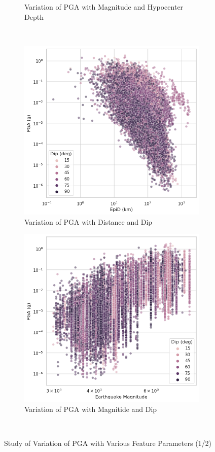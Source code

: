 \documentclass[a4paper,10pt]{article}
\begin{document}
\begin{figure}[h]
\begin{subfigure}[b]{0.45\textwidth}
         \caption{Variation of PGA with Magnitude and Hypocenter Depth}
     \end{subfigure} \\
     \begin{subfigure}[b]{0.45\textwidth}
         \centering
         \includegraphics[width=\textwidth]{PGA_distance_Dip}
         \caption{Variation of PGA with Distance and Dip}
     \end{subfigure}
     \hfill
     \begin{subfigure}[b]{0.45\textwidth}
         \centering
         \includegraphics[width=\textwidth]{PGA_Mag_Dip}
         \caption{Variation of PGA with Magnitide and Dip}
     \end{subfigure} \\
     \caption{Study of Variation of PGA with Various Feature Parameters (1/2)}
        \label{fig:datasets}
\end{figure}
\end{document}
